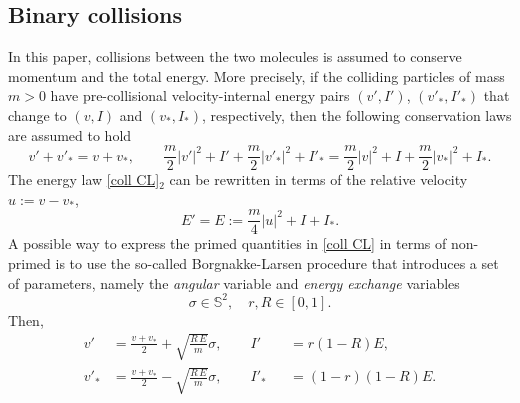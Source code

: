 \documentclass[11pt,a4paper]{amsart}
\newcommand{\bS}{\mathbb{S}^2}
\newcommand{\V}{\frac{v+v_*}{2}}
\begin{document}
 \subsection{Binary collisions }\label{Sec: bin coll}
 In this paper, collisions between the two molecules is assumed to conserve  momentum and the total energy. More precisely, 
 if the colliding particles of mass $m>0$ have pre-collisional velocity-internal energy pairs $(v', I')$, $(v'_*, I'_*)$ that change to $(v, I)$ and $(v_*, I_*)$, respectively, then the following conservation laws are assumed to hold
 \begin{equation}\label{coll CL}
 	v' + v'_*  = v + v_*, \qquad \frac{m}{2} |v'|^2 + I' +  \frac{m}{2} |v'_*|^2 + I'_* = \frac{m}{2} |v|^2 + I +  \frac{m}{2} |v_*|^2 + I_*.
 \end{equation}
 The energy law \eqref{coll CL}$_2$ can be rewritten in terms of the relative velocity $u:=v-v_*$,
 \begin{equation}\label{en}
 	E' = E := \frac{m}{4} |u|^2 + I +  I_*.  
 \end{equation}  
 A possible way to express the primed quantities in \eqref{coll CL} in terms of non-primed is to use the so-called Borgnakke-Larsen procedure  \cite{Bor-Larsen, LD-Bourgat}  that introduces a set of parameters, namely the \emph{angular} variable and \emph{energy exchange} variables 
 \begin{equation}\label{Bor-Lar param}
 	\sigma\in\bS, \quad r, R \in [0,1].
 \end{equation}
 Then, 
 \begin{equation}\label{coll rules}
 	\begin{alignedat}{2}
 		v'  &= \V + \sqrt{\frac{ R  \, E}{m}} \sigma,  \qquad
 		I' &&=r (1-R)E, \\
 		v'_{*} &= \V -   \sqrt{\frac{  R \,  E}{m}} \sigma,
 		\qquad I'_* &&= (1-r)(1-R) E. 
 	\end{alignedat}
 \end{equation}
 
 
\end{document}
